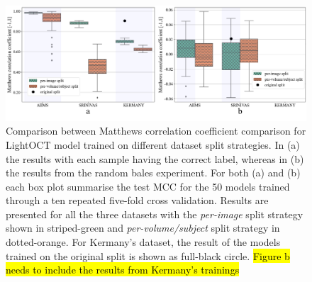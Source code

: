 \documentclass[fleqn,10pt]{wlscirep}
\begin{document}
\begin{figure}[t]
\centering
\includegraphics[width=500pt]{OCT_inflation_results_1_v2.pdf}
\caption{Comparison between Matthews correlation coefficient comparison for LightOCT model trained on different dataset split strategies.  In (a) the results with each sample having the correct label, whereas in (b) the results from the random bales experiment. For both (a) and (b) each box plot summarise the test MCC for the 50 models trained through a ten repeated five-fold cross validation.  Results are presented for all the three datasets with the \textit{per-image} split strategy shown in striped-green and \textit{per-volume/subject} split strategy in dotted-orange. For Kermany's dataset, the result of the models trained on the original split is shown as full-black circle. \hl{Figure b needs to include the results from Kermany's trainings}}
\label{fig:results_1}
\end{figure}
\end{document}
